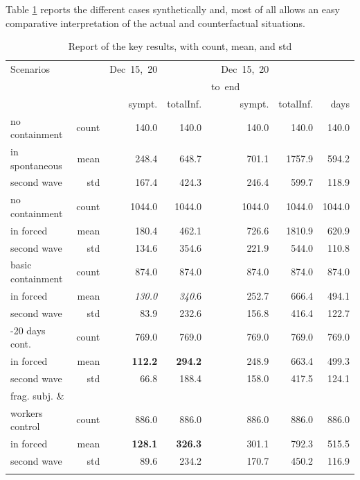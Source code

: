 \documentclass[graybox]{svmult}
\begin{document}
Table \ref{keyResultsT} reports the different cases synthetically and, most of all allows an easy comparative interpretation of the actual and counterfactual situations.



\begin{table}[t]
\center
\footnotesize
\begin{tabular}{lrrrrrr}
\hline\noalign{\smallskip}
Scenarios & & Dec~15,~20 & & Dec~15,~20\\
& & & & to~end~~~~~~ \\
 & & sympt. & totalInf. & sympt. & totalInf. & days \\ 

\noalign{\smallskip}\svhline\noalign{\smallskip}

no containment & count & 140.0 & 140.0 & 140.0 & 140.0 & 140.0 \\
in spontaneous & mean & 248.4 & 648.7 & 701.1 & 1757.9 & 594.2 \\
second wave & std & 167.4 & 424.3 & 246.4 & 599.7 & 118.9 \\

\hline\noalign{\smallskip}
no containment & count & 1044.0 & 1044.0 & 1044.0 & 1044.0 & 1044.0 \\
in forced & mean & 180.4 & 462.1 & 726.6 & 1810.9 & 620.9 \\
second wave & std & 134.6 & 354.6 & 221.9 & 544.0 & 110.8 \\

\hline\noalign{\smallskip}
basic containment & count & 874.0 & 874.0 & 874.0 & 874.0 & 874.0 \\
in forced & mean & \emph{130.0} & \emph{340}.6 & 252.7 & 666.4 & 494.1 \\
second wave & std & 83.9 & 232.6 & 156.8 & 416.4 & 122.7 \\
 
\hline\noalign{\smallskip}
-20 days cont. & count & 769.0 & 769.0 & 769.0 & 769.0 & 769.0 \\
in forced & mean & \textbf{{\color{red}112.2}} & \textbf{{\color{red} 294.2}} & 248.9 & 663.4 & 499.3 \\
second wave & std & 66.8 & 188.4 & 158.0 & 417.5 & 124.1 \\

\hline\noalign{\smallskip}
frag. subj. \& \\ 
workers control & count & 886.0 & 886.0 & 886.0 & 886.0 & 886.0 \\
in forced & mean & \textbf{{\color{violet}128.1}} & \textbf{{\color{violet}326.3}} & 301.1 & 792.3 & 515.5 \\
second wave & std & 89.6 & 234.2 & 170.7 & 450.2 & 116.9 \\


\hline\noalign{\smallskip}
\end{tabular}
\caption{Report of the key results, with count, mean, and std}
\label{keyResultsT}
\end{table}
\end{document}

